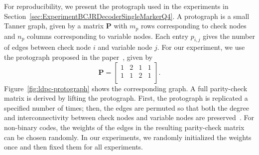 \documentclass[conference,letterpaperu]{IEEEtran}
\begin{document}
For reproducibility, we present the protograph used in the experiments in Section~\ref{sec:ExperimentBCJRDecoderSingleMarkerQ4}. A protograph is a small Tanner graph, given by a matrix $\bm{P}$ with $m_p$ rows corresponding to check nodes and $n_p$ columns corresponding to variable nodes. Each entry $p_{i,j}$ gives the number of edges between check node $i$ and variable node $j$. For our experiment, we use the protograph proposed in the paper~\cite{maaroufConcatenatedCodesMultiple2023a}, given by 
$$
    \bm{P} = \begin{bmatrix}
        1 & 2 & 1 & 1 \\
        1 & 1 & 2 & 1 \\
    \end{bmatrix}.
$$
Figure~\ref{fig:ldpc-protograph} shows the corresponding graph. A full parity-check matrix is derived by lifting the protograph. First, the protograph is replicated a specified number of times; then, the edges are permuted so that both the degree and interconnectivity between check nodes and variable nodes are preserved~\cite{butlerBoundsMinimumDistance2013}. For non-binary codes, the weights of the edges in the resulting parity-check matrix can be chosen randomly. In our experiments, we randomly initialized the weights once and then fixed them for all experiments. 
\end{document}
